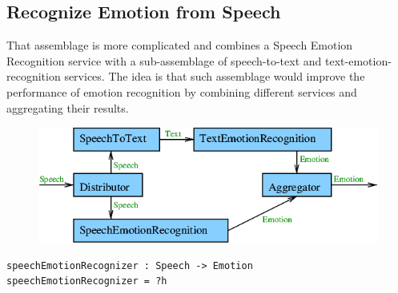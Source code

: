 \documentclass[]{article}
\begin{document}
\subsection{Recognize Emotion from Speech}
That assemblage is more complicated and combines a Speech Emotion
Recognition service with a sub-assemblage of speech-to-text and
text-emotion-recognition services.  The idea is that such assemblage
would improve the performance of emotion recognition by combining
different services and aggregating their results.
\begin{figure}[H]
  \centering
  \includegraphics[scale=0.55]{figs/SpeechEmotionRecognition.png}
\end{figure}
\begin{verbatim}
speechEmotionRecognizer : Speech -> Emotion
speechEmotionRecognizer = ?h
\end{verbatim}
\end{document}
